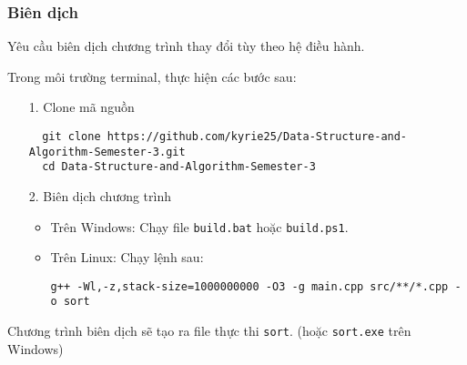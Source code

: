 \subsubsection{Biên dịch}
Yêu cầu biên dịch chương trình thay đổi tùy theo hệ điều hành.

Trong môi trường terminal, thực hiện các bước sau:
\begin{itemize}
  \item[1.] Clone mã nguồn
  \begin{verbatim}
  git clone https://github.com/kyrie25/Data-Structure-and-Algorithm-Semester-3.git
  cd Data-Structure-and-Algorithm-Semester-3
  \end{verbatim}
  \item[2.] Biên dịch chương trình
  \begin{itemize}
    \item Trên Windows:
    Chạy file \texttt{build.bat} hoặc \texttt{build.ps1}. 
    \item Trên Linux:
    Chạy lệnh sau:
    \begin{verbatim}
g++ -Wl,-z,stack-size=1000000000 -O3 -g main.cpp src/**/*.cpp -o sort 
    \end{verbatim}
  \end{itemize}
\end{itemize}
Chương trình biên dịch sẽ tạo ra file thực thi \texttt{sort}. (hoặc \texttt{sort.exe} trên Windows)

\newpage